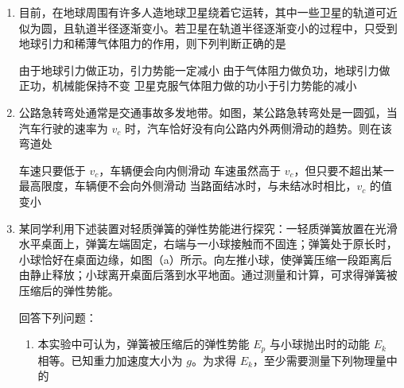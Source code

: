 \documentclass[\gkver]{gaokaozhenti}
\begin{document}
\begin{enumerate}

\item
目前，在地球周围有许多人造地球卫星绕着它运转，其中一些卫星的轨道可近似为圆，且轨道半径逐渐变小。若卫星在轨道半径逐渐变小的过程中，只受到地球引力和稀薄气体阻力的作用，则下列判断正确的是

{由于地球引力做正功，引力势能一定减小}
{由于气体阻力做负功，地球引力做正功，机械能保持不变}
{卫星克服气体阻力做的功小于引力势能的减小}


\item
公路急转弯处通常是交通事故多发地带。如图，某公路急转弯处是一圆弧，当汽车行驶的速率为 $v_{c}$ 时，汽车恰好没有向公路内外两侧滑动的趋势。则在该弯道处


{车速只要低于 $v_{c}$，车辆便会向内侧滑动}
{车速虽然高于 $v_{c}$，但只要不超出某一最高限度，车辆便不会向外侧滑动}
{当路面结冰时，与未结冰时相比，$v_{c}$ 的值变小}


\item
某同学利用下述装置对轻质弹簧的弹性势能进行探究：一轻质弹簧放置在光滑水平桌面上，弹簧左端固定，右端与一小球接触而不固连；弹簧处于原长时，小球恰好在桌面边缘，如图（a）所示。向左推小球，使弹簧压缩一段距离后由静止释放；小球离开桌面后落到水平地面。通过测量和计算，可求得弹簧被压缩后的弹性势能。

回答下列问题：
\begin{enumerate}
	\item
	本实验中可认为，弹簧被压缩后的弹性势能 $E_{p}$ 与小球抛出时的动能 $E_{k}$ 相等。已知重力加速度大小为 $g$。为求得 $E_{k}$，至少需要测量下列物理量中的


\end{enumerate}
\end{enumerate}
\end{document}
